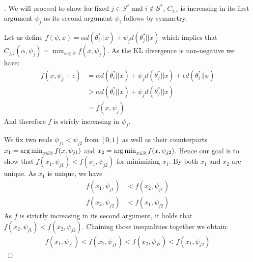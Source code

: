 \begin{proof}[]
  We will proceed to show for fixed $j \in S^*$ and $i \notin S^*$, $C_{j, i}$ is increasing in its first argument $\psi_j$ as its second argument $\psi_i$ follows by symmetry.

  Let us define $f(\psi, x) = \alpha d(\theta_i^*||x) + \psi_jd(\theta_j^*||x)$ which implies that $C_{j, i}(\alpha, \psi_j) = \min_{x \in \mathbb{R}} f(x, \psi_j)$. As the KL divergence is non-negative we have:
  \begin{align}
    f(x, \psi_j + \epsilon) &= \alpha d(\theta_i^*||x) + \psi_j d(\theta_j^*||x) + \epsilon d(\theta_j^*||x) \\
    &> \alpha d(\theta_i^*||x) + \psi_j d(\theta_j^*||x)\\
    &= f(x, \psi_j)
  \end{align}
  And therefore $f$ is stricly increasing in $\psi_j$.

  We fix two reals $\psi_{j1} < \psi_{j2}$ from $[0, 1]$ as well as their counterparts $x_1 = \operatorname*{arg\,min}_{x \in \mathbb{R}} f(x, \psi_{j1})$ and $x_2 = \operatorname*{arg\,min}_{x \in \mathbb{R}} f(x, \psi_{j2})$. Hence our goal is to show that $f(x_1, \psi_{j1}) < f(x_1, \psi_{j2})$ for minimizing $x_1$. By  both $x_1$ and $x_2$ are unique. As $x_1$ is unique, we have
  \begin{align}
    f(x_1, \psi_{j1}) &< f(x_2, \psi_{j1}) \\
    f(x_2, \psi_{j2}) &< f(x_1, \psi_{j2})
  \end{align}
  As $f$ is strictly increasing in its second argument, it holds that $f(x_2, \psi_{j1}) < f(x_2, \psi_{j2})$. Chaining those inequalities together we obtain:
  \begin{align}
    f(x_1, \psi_{j1}) < f(x_2, \psi_{j1})  < f(x_2, \psi_{j2}) < f(x_1, \psi_{j2})
  \end{align}
\end{proof}

